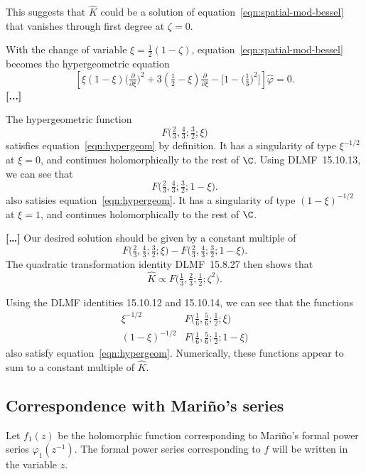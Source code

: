 \documentclass{article}
\theoremstyle{definition}
\theoremstyle{plain}
\begin{document}
This suggests that $\hat{K}$ could be a solution of equation~\ref{eqn:spatial-mod-bessel} that vanishes through first degree at $\zeta = 0$.

With the change of variable $\xi = \tfrac{1}{2}(1-\zeta)$, equation~\ref{eqn:spatial-mod-bessel} becomes the hypergeometric equation
\begin{equation}\label{eqn:hypergeom}
\left[\xi(1 - \xi) \big(\tfrac{\partial}{\partial \xi}\big)^2 + 3(\tfrac{1}{2} - \xi) \tfrac{\partial}{\partial \xi} - \big[1 - \big(\tfrac{1}{3}\big)^2\big]\right] \hat{\varphi} = 0.
\end{equation}
\textbf{[...]}

The hypergeometric function
\[ F\big(\tfrac{2}{3}, \tfrac{4}{3}; \tfrac{3}{2}; \xi\big) \]
satisfies equation~\ref{eqn:hypergeom} by definition. It has a singularity of type $\xi^{-1/2}$ at $\xi = 0$, and continues holomorphically to the rest of $\C$. Using DLMF~15.10.13, we can see that
\[ F\big(\tfrac{2}{3}, \tfrac{4}{3}; \tfrac{3}{2}; 1-\xi\big). \]
also satisies equation~\ref{eqn:hypergeom}. It has a singularity of type $(1 - \xi)^{-1/2}$ at $\xi = 1$, and continues holomorphically to the rest of $\C$.

\textbf{[\ldots]} Our desired solution should be given by a constant multiple of
\[ F\big(\tfrac{2}{3}, \tfrac{4}{3}; \tfrac{3}{2}; \xi\big) - F\big(\tfrac{2}{3}, \tfrac{4}{3}; \tfrac{3}{2}; 1-\xi\big). \]
The quadratic transformation identity DLMF~15.8.27 then shows that
\[ \hat{K} \propto F\big(\tfrac{1}{3}, \tfrac{2}{3}; \tfrac{1}{2}; \zeta^2\big). \]

Using the DLMF identities 15.10.12 and 15.10.14, we can see that the functions
\begin{align*}
\xi^{-1/2} & F\big(\tfrac{1}{6}, \tfrac{5}{6}; \tfrac{1}{2}; \xi\big) \\
(1-\xi)^{-1/2} & F\big(\tfrac{1}{6}, \tfrac{5}{6}; \tfrac{1}{2}; 1-\xi\big)
\end{align*}
also satisfy equation~\ref{eqn:hypergeom}. Numerically, these functions appear to sum to a constant multiple of $\hat{K}$.
\subsection{Correspondence with Mari\~{n}o's series}
Let $f_1(z)$ be the holomorphic function corresponding to Mari\~{n}o's formal power series $\varphi_1(z^{-1})$. The formal power series corresponding to $f$ will be written in the variable $z$.
\end{document}
